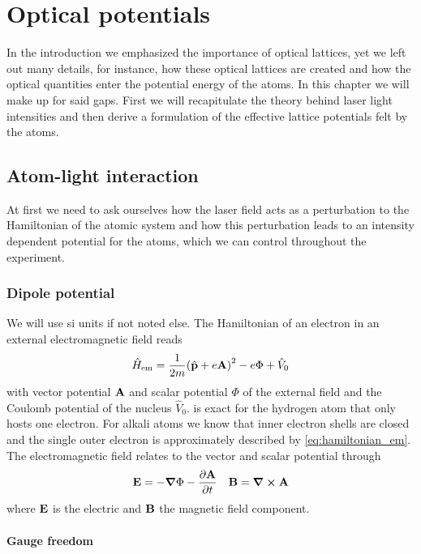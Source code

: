 \chapter{Optical potentials}

In the introduction we emphasized the importance of optical lattices, yet we
left out many details, for instance, how these optical lattices are created
and how the optical quantities enter the potential energy of the atoms. In
this chapter we will make up for said gaps. First we will recapitulate the
theory behind laser light intensities and then derive a formulation of the
effective lattice potentials felt by the atoms.

\section{Atom-light interaction}

At first we need to ask ourselves how the laser field acts as a perturbation
to the Hamiltonian of the atomic system and how this perturbation leads to an
intensity dependent potential for the atoms, which we can control throughout
the experiment.

\subsection{Dipole potential}

We will use \gls{si} units if not noted else. The Hamiltonian of an electron
in an external electromagnetic field reads
\begin{equation}
  \hat{H}_\text{em}
  =\frac{1}{2m}{\left(\hat{\vb{p}}+e\vb{A}\right)}^2-e\Phi+\hat{V}_0
  \label{eq:hamiltonian_em}
\end{equation}
with vector potential $\vb{A}$ and scalar potential $\Phi$ of the external
field and the Coulomb potential of the nucleus $\hat{V}_0$.
 is exact for the hydrogen atom that only hosts one
electron. For alkali atoms we know that inner electron shells are closed and
the single outer electron is approximately described by
\cref{eq:hamiltonian_em}. The electromagnetic field relates to the
vector and scalar potential through
\begin{align}
  \vb{E}=-\grad{\Phi}-\pdv{\vb{A}}{t} &&
  \vb{B}=\curl{\vb{A}}
  \label{eq:field_em_potentials}
\end{align}
where $\vb{E}$ is the electric and $\vb{B}$ the magnetic field component.

\subsubsection{Gauge freedom}


